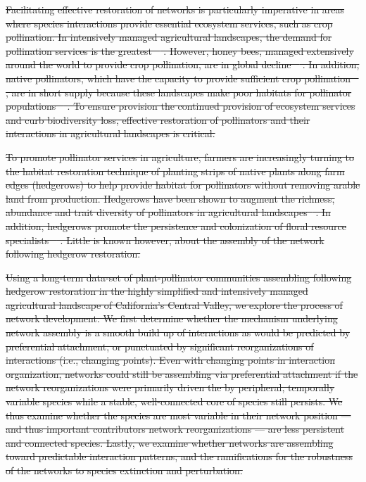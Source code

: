 \documentclass[12pt]{article}
\providecommand{\DIFdeltex}[1]{{\protect\color{red}\sout{#1}}}                      %
\providecommand{\DIFdel}[1]{\texorpdfstring{\DIFdeltex{#1}}{}} %
\begin{document}
\DIFdel{Facilitating effective restoration of networks is particularly
imperative in areas where species interactions provide essential
ecosystem services, such as crop pollination. In intensively managed
agricultural landscapes, the demand for pollination services is the
greatest \mbox{%
\citep{kremen-2008-10}}%
. However, honey bees, managed
extensively around the world to provide crop pollination, are in
global decline \mbox{%
\citep{neumann-2010-1, van-engelsdorp-2009-e6481}}%
. In
addition, native pollinators, which have the capacity to provide
sufficient crop pollination \mbox{%
\citep{kremen-2002-16816,
  winfree-2007-1105, kremen-2004-1109}}%
, are in short supply because
these landscapes make poor habitats for pollinator populations
\mbox{%
\citep{kremen-2002-16816}}%
. To ensure provision the continued provision
of ecosystem services and curb biodiversity loss, effective
restoration of pollinators and their interactions in agricultural
landscapes is critical.
}%

\DIFdel{To promote pollinator services in agriculture, farmers are
increasingly turning to the habitat restoration technique of planting
strips of native plants along farm edges (hedgerows) to help provide
habitat for pollinators without removing arable land from
production. Hedgerows have been shown to augment the richness,
abundance and trait diversity of pollinators in agricultural
landscapes\mbox{%
\citep{morandin-2013-829, mgonigle-2015-x, kremen-2015-602,
  ponisio2015farm}}%
. In addition, hedgerows promote the persistence and
colonization of floral resource specialists
\mbox{%
\citep{mgonigle-2015-x}}%
. Little is known however, about the assembly
of the network following hedgerow restoration. 
}%

\DIFdel{Using a long-term data-set of plant-pollinator communities assembling
following hedgerow restoration in the highly simplified and
intensively managed agricultural landscape of California's Central
Valley, we explore the process of network development. We first
determine whether the mechanism underlying network assembly is a
smooth build up of interactions as would be predicted by preferential
attachment, or punctuated by significant reorganizations of
interactions (i.e., changing points). Even with changing points in
interaction organization, networks could still be assembling via
preferential attachment if the network reorganizations were primarily
driven the by peripheral, temporally variable species while a stable,
well-connected core of species still persists. We thus examine whether
the species are most variable in their network position --- and thus
important contributors network reorganizations --- are less persistent
and connected species. %
Lastly, we examine whether networks are assembling toward predictable
interaction patterns, and the ramifications for the robustness of the
networks to species extinction and perturbation.  
}%
\end{document}
